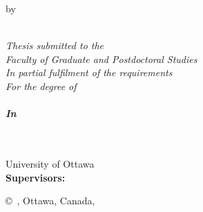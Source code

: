 
\pagestyle{empty} %

\begin{center}

\vspace*{0cm}
{\bfseries \LARGE %
  \thesistitlecoverpage}

\vspace*{1.0cm}
\normalsize
by \\
\vspace*{1.0cm}
\Large
\thesisauthor\\
\vspace*{1.5cm}
\normalsize
{\itshape
  Thesis submitted to the\\
  Faculty of Graduate and Postdoctoral Studies\\
  In partial fulfilment of the requirements\\
  For the degree of\\
  \vspace*{1.5cm}
  {\bfseries
    \degree\\
    In\\
    \nameofprogram\\}

  \vspace*{1.5cm}
  \academicunit\\
  University of Ottawa\\

  \vspace*{1.5cm}
  \textbf{Supervisors:}
  \supervisors\\
}
\vspace*{2.0cm}
\copyright~\thesisauthor, Ottawa, Canada, \graduationyear\\

\end{center}

\newpage
 

\pagestyle{plain} %
\setcounter{page}{2}



